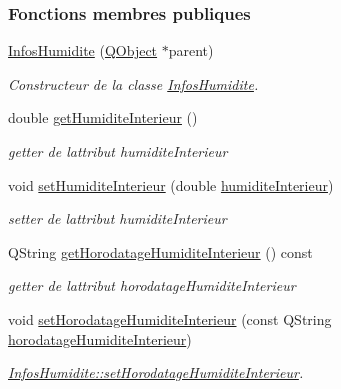 \subsubsection*{Fonctions membres publiques}
\begin{DoxyCompactItemize}
\item 
\hyperlink{class_infos_humidite_a3c87ffa0e896fd5af90b1d9f15a47a57}{Infos\+Humidite} (\hyperlink{class_q_object}{Q\+Object} $\ast$parent)
\begin{DoxyCompactList}\small\item\em Constructeur de la classe \hyperlink{class_infos_humidite}{Infos\+Humidite}. \end{DoxyCompactList}\item 
double \hyperlink{class_infos_humidite_a652f7ca3e4b97352034fed62c6d865b7}{get\+Humidite\+Interieur} ()
\begin{DoxyCompactList}\small\item\em getter de l\textquotesingle{}attribut humidite\+Interieur \end{DoxyCompactList}\item 
void \hyperlink{class_infos_humidite_a238c8b3bd6b09c4f770058a05468baa8}{set\+Humidite\+Interieur} (double \hyperlink{class_infos_humidite_ad2847e671ad0b90f8dc0940dee107c38}{humidite\+Interieur})
\begin{DoxyCompactList}\small\item\em setter de l\textquotesingle{}attribut humidite\+Interieur \end{DoxyCompactList}\item 
Q\+String \hyperlink{class_infos_humidite_a841d2583f206a9097fa3871adc8be568}{get\+Horodatage\+Humidite\+Interieur} () const
\begin{DoxyCompactList}\small\item\em getter de l\textquotesingle{}attribut horodatage\+Humidite\+Interieur \end{DoxyCompactList}\item 
void \hyperlink{class_infos_humidite_a8054d13ab8f57504392756351c376534}{set\+Horodatage\+Humidite\+Interieur} (const Q\+String \hyperlink{class_infos_humidite_a38712bac5a2d4d106a016647ad39fedf}{horodatage\+Humidite\+Interieur})
\begin{DoxyCompactList}\small\item\em \hyperlink{class_infos_humidite_a8054d13ab8f57504392756351c376534}{Infos\+Humidite\+::set\+Horodatage\+Humidite\+Interieur}. \end{DoxyCompactList}\item 

\end{DoxyCompactItemize}
